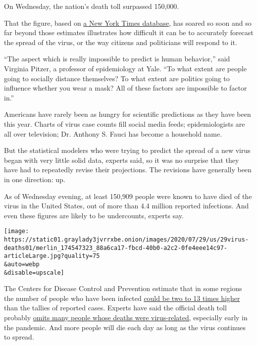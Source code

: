 On Wednesday, the nation's death toll surpassed 150,000.

That the figure, based on
\href{https://www.nytimes3xbfgragh.onion/interactive/2020/us/coronavirus-us-cases.html?action=click\&pgtype=Article\&state=default\&module=STYLN_pharmacy_components\&region=TOP_BANNER\&context=storylines_menu}{a
New York Times database}, has soared so soon and so far beyond those
estimates illustrates how difficult it can be to accurately forecast the
spread of the virus, or the way citizens and politicians will respond to
it.

``The aspect which is really impossible to predict is human behavior,''
said Virginia Pitzer, a professor of epidemiology at Yale. ``To what
extent are people going to socially distance themselves? To what extent
are politics going to influence whether you wear a mask? All of these
factors are impossible to factor in.''

Americans have rarely been as hungry for scientific predictions as they
have been this year. Charts of virus case counts fill social media
feeds; epidemiologists are all over television; Dr. Anthony S. Fauci has
become a household name.

But the statistical modelers who were trying to predict the spread of a
new virus began with very little solid data, experts said, so it was no
surprise that they have had to repeatedly revise their projections. The
revisions have generally been in one direction: up.

As of Wednesday evening, at least 150,909 people were known to have died
of the virus in the United States, out of more than 4.4 million reported
infections. And even these figures are likely to be undercounts, experts
say.

\texttt{[image: https://static01.graylady3jvrrxbe.onion/images/2020/07/29/us/29virus-deaths01/merlin\_174547323\_88a6ca17-fbcd-40b0-a2c2-0fe4eee14c97-articleLarge.jpg?quality=75\\\&auto=webp\\\&disable=upscale]}

The Centers for Disease Control and Prevention estimate that in some
regions the number of people who have been infected
\href{https://www.nytimes3xbfgragh.onion/2020/07/21/health/coronavirus-infections-us.html}{could
be two to 13 times higher} than the tallies of reported cases. Experts
have said the official death toll probably
\href{https://www.nytimes3xbfgragh.onion/2020/04/05/us/coronavirus-deaths-undercount.html}{omits
many people whose deaths were virus-related,} especially early in the
pandemic. And more people will die each day as long as the virus
continues to spread.

